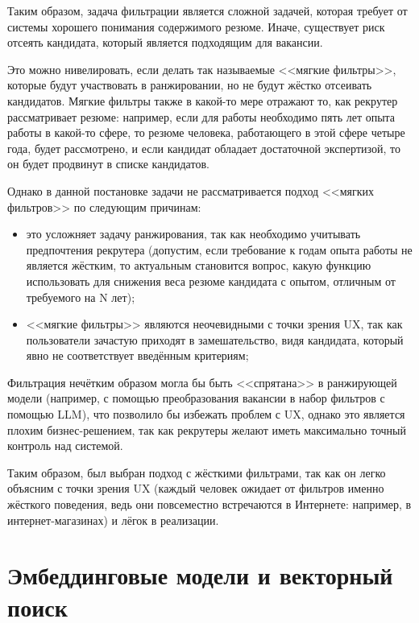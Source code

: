 \documentclass[14pt]{mmcs_article}
\begin{document}
Таким образом, задача фильтрации является сложной задачей, которая требует от системы хорошего понимания содержимого резюме. Иначе, существует риск отсеять кандидата, который является подходящим для вакансии.

Это можно нивелировать, если делать так называемые <<мягкие фильтры>>, которые будут участвовать в ранжировании, но не будут жёстко отсеивать кандидатов. Мягкие фильтры также в какой-то мере отражают то, как рекрутер рассматривает резюме: например, если для работы необходимо пять лет опыта работы в какой-то сфере, то резюме человека, работающего в этой сфере четыре года, будет рассмотрено, и если кандидат обладает достаточной экспертизой, то он будет продвинут в списке кандидатов.

Однако в данной постановке задачи не рассматривается подход <<мягких фильтров>> по следующим причинам:

\begin{itemize}
  \item это усложняет задачу ранжирования, так как необходимо учитывать предпочтения рекрутера (допустим, если требование к годам опыта работы не является жёстким, то актуальным становится вопрос, какую функцию использовать для снижения веса резюме кандидата с опытом, отличным от требуемого на N лет);
  \item <<мягкие фильтры>> являются неочевидными с точки зрения UX, так как пользователи зачастую приходят в замешательство, видя кандидата, который явно не соответствует введённым критериям;
\end{itemize}

Фильтрация нечётким образом могла бы быть <<спрятана>> в ранжирующей модели (например, с помощью преобразования вакансии в набор фильтров с помощью LLM), что позволило бы избежать проблем с UX, однако это является плохим бизнес-решением, так как рекрутеры желают иметь максимально точный контроль над системой.

Таким образом, был выбран подход с жёсткими фильтрами, так как он легко объясним с точки зрения UX (каждый человек ожидает от фильтров именно жёсткого поведения, ведь они повсеместно встречаются в Интернете: например, в интернет-магазинах) и лёгок в реализации.


\newpage
\section{Эмбеддинговые модели и векторный поиск}\label{embedding_models}
\end{document}
